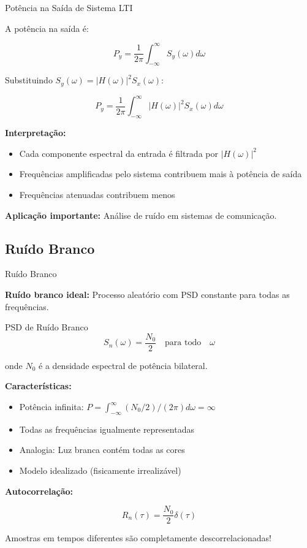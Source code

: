 \begin{frame}{Potência na Saída de Sistema LTI}

A potência na saída é:

\[
P_y = \frac{1}{2\pi} \int_{-\infty}^{\infty} S_y(\omega) d\omega
\]

Substituindo $S_y(\omega) = |H(\omega)|^2 S_x(\omega)$:

\[
P_y = \frac{1}{2\pi} \int_{-\infty}^{\infty} |H(\omega)|^2 S_x(\omega) d\omega
\]

\textbf{Interpretação:}

\begin{itemize}
\item Cada componente espectral da entrada é filtrada por $|H(\omega)|^2$
\item Frequências amplificadas pelo sistema contribuem mais à potência de saída
\item Frequências atenuadas contribuem menos
\end{itemize}

\vspace{0.1cm}

\textbf{Aplicação importante:} Análise de ruído em sistemas de comunicação.

\end{frame}


\subsection{Ruído Branco}

\begin{frame}{Ruído Branco}

\textbf{Ruído branco ideal:} Processo aleatório com PSD constante para todas as frequências.

\begin{block}{PSD de Ruído Branco}
\[
S_n(\omega) = \frac{N_0}{2} \quad \text{para todo} \quad \omega
\]
\end{block}

onde $N_0$ é a densidade espectral de potência bilateral.

\vspace{0.1cm}

\textbf{Características:}

\begin{itemize}
\item Potência infinita: $P = \int_{-\infty}^{\infty} (N_0/2)/(2\pi) d\omega = \infty$
\item Todas as frequências igualmente representadas
\item Analogia: Luz branca contém todas as cores
\item Modelo idealizado (fisicamente irrealizável)
\end{itemize}

\textbf{Autocorrelação:}

\[
R_n(\tau) = \frac{N_0}{2} \delta(\tau)
\]

Amostras em tempos diferentes são completamente descorrelacionadas!

\end{frame}


